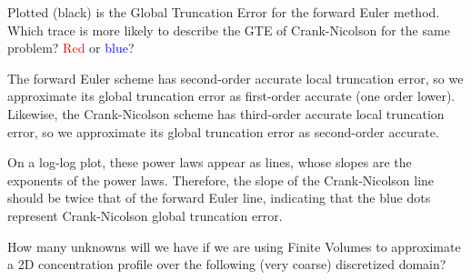 \begin{exercise} %
    Plotted (black) is the Global Truncation Error for the forward Euler method. Which trace is more likely to describe the GTE of Crank-Nicolson for the same problem? \textcolor{red}{Red} or \textcolor{blue}{blue}?

\end{exercise}

\begin{solution}
    The forward Euler scheme has second-order accurate local truncation error, so we approximate its global truncation error as first-order accurate (one order lower). Likewise, the Crank-Nicolson scheme has third-order accurate local truncation error, so we approximate its global truncation error as second-order accurate.

    On a log-log plot, these power laws appear as lines, whose slopes are the exponents of the power laws. Therefore, the slope of the Crank-Nicolson line should be twice that of the forward Euler line, indicating that the blue dots represent Crank-Nicolson global truncation error.
\end{solution}

\begin{exercise} %
    How many unknowns will we have if we are using Finite Volumes to approximate a 2D concentration profile over the following (very coarse) discretized domain?

    \begin{center}
    \end{center}
\end{exercise}

